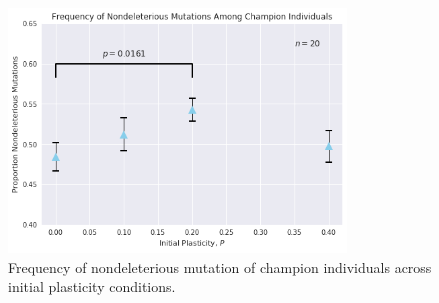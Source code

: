 \begin{figure}
    \centering
    \includegraphics[width=0.8\textwidth]{img/freq_nondeleterious_plastic}
 	\captionsetup{singlelinecheck=off,justification=raggedright}
  	\caption{Frequency of nondeleterious mutation of champion individuals across initial plasticity conditions.}
    \label{fig:freq_nondeleterious_plastic}
\end{figure}